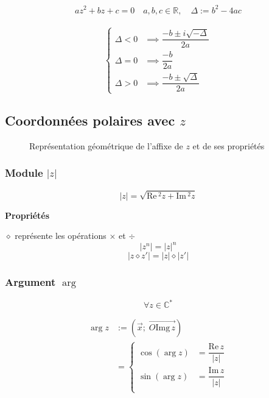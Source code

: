 \documentclass{article}
\newcommand{\im}{\text{Im}\,}
\newcommand{\re}{\text{Re}\,}
\newcommand{\img}{\text{Img}\,}
\newcommand{\R}{\mathds{R}}
\newcommand{\C}{\mathds{C}}
\newcommand{\Aff}{\text{Aff}}
\newcommand{\placeholder}{\diamond}
\newcommand{\vect}[1]{\overrightarrow{#1}}
\begin{document}
\[az^2+bz+c = 0\quad a, b, c \in \R,\quad\Delta := b^2-4ac\]\\
$$
\begin{cases}
\Delta < 0 &\implies \dfrac{-b\pm i\sqrt{-\Delta}}{2a}  \\
\Delta = 0 &\implies \dfrac{-b}{2a} \\
\Delta > 0 &\implies \dfrac{-b\pm\sqrt{\Delta}}{2a}
\end{cases}
$$

\subsection{Coordonnées polaires avec $z$}
\begin{figure}[h]
    \centering
    \caption{Représentation géométrique de l'affixe de $z$ et de ses propriétés}
    \label{fig:my_label}
\end{figure}

\subsubsection{Module $|z|$}

\[|z| = \sqrt{\re^2z + \im^2z}\]

\textbf{Propriétés}

$\placeholder$ représente les opérations $\times$ et $\div$
\[ |z^n| = |z|^n \]
\[ | z \placeholder z' | = |z|\placeholder|z'|\]


\subsubsection{Argument $\arg$}

\[\forall z \in \C^\ast\]

\begin{equation*}
    \begin{split}
        \arg z &:= \left( \vec x ;\; \vect{O \img z} \right) \\
            &= \begin{cases}
            \cos(\arg z) &= \dfrac{\re z}{|z|} \\
            \sin(\arg z) &= \dfrac{\im z}{|z|} \\
            \end{cases}
    \end{split}
\end{equation*}
\end{document}

